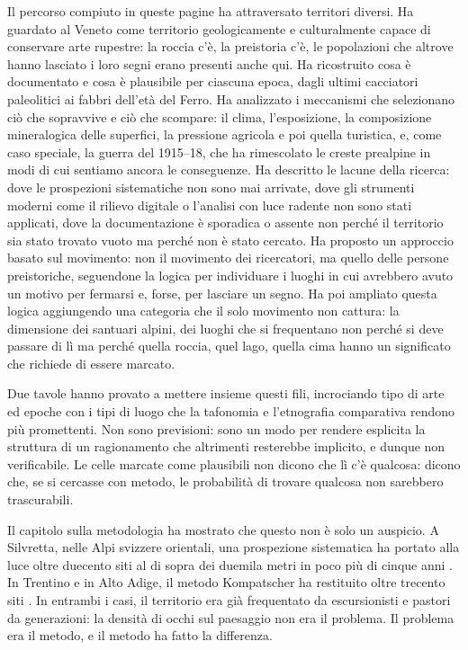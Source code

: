 Il percorso compiuto in queste pagine ha attraversato territori diversi. Ha guardato al Veneto come territorio geologicamente e culturalmente capace di conservare arte rupestre: la roccia c'è, la preistoria c'è, le popolazioni che altrove hanno lasciato i loro segni erano presenti anche qui. Ha ricostruito cosa è documentato e cosa è plausibile per ciascuna epoca, dagli ultimi cacciatori paleolitici ai fabbri dell'età del Ferro. Ha analizzato i meccanismi che selezionano ciò che sopravvive e ciò che scompare: il clima, l'esposizione, la composizione mineralogica delle superfici, la pressione agricola e poi quella turistica, e, come caso speciale, la guerra del 1915--18, che ha rimescolato le creste prealpine in modi di cui sentiamo ancora le conseguenze. Ha descritto le lacune della ricerca: dove le prospezioni sistematiche non sono mai arrivate, dove gli strumenti moderni come il rilievo digitale o l'analisi con luce radente non sono stati applicati, dove la documentazione è sporadica o assente non perché il territorio sia stato trovato vuoto ma perché non è stato cercato. Ha proposto un approccio basato sul movimento: non il movimento dei ricercatori, ma quello delle persone preistoriche, seguendone la logica per individuare i luoghi in cui avrebbero avuto un motivo per fermarsi e, forse, per lasciare un segno. Ha poi ampliato questa logica aggiungendo una categoria che il solo movimento non cattura: la dimensione dei santuari alpini, dei luoghi che si frequentano non perché si deve passare di lì ma perché quella roccia, quel lago, quella cima hanno un significato che richiede di essere marcato.

Due tavole hanno provato a mettere insieme questi fili, incrociando tipo di arte ed epoche con i tipi di luogo che la tafonomia e l'etnografia comparativa rendono più promettenti. Non sono previsioni: sono un modo per rendere esplicita la struttura di un ragionamento che altrimenti resterebbe implicito, e dunque non verificabile. Le celle marcate come plausibili non dicono che lì c'è qualcosa: dicono che, se si cercasse con metodo, le probabilità di trovare qualcosa non sarebbero trascurabili.

Il capitolo sulla metodologia ha mostrato che questo non è solo un auspicio. A Silvretta, nelle Alpi svizzere orientali, una prospezione sistematica ha portato alla luce oltre duecento siti al di sopra dei duemila metri in poco più di cinque anni \citep{cornelissen2016}. In Trentino e in Alto Adige, il metodo Kompatscher ha restituito oltre trecento siti \citep{kompatscher2007}. In entrambi i casi, il territorio era già frequentato da escursionisti e pastori da generazioni: la densità di occhi sul paesaggio non era il problema. Il problema era il metodo, e il metodo ha fatto la differenza.

